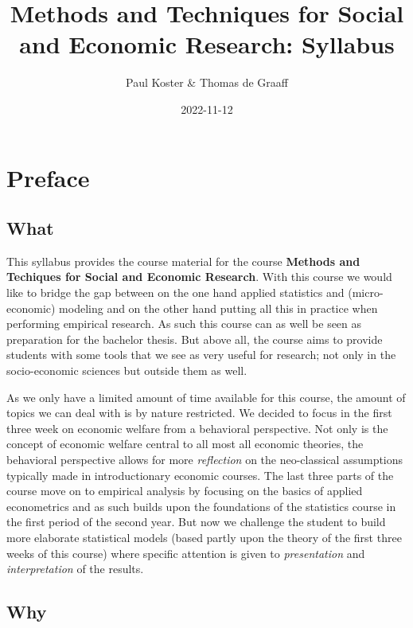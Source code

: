 \documentclass[
]{book}
\title{Methods and Techniques for Social and Economic Research: Syllabus}
\author{Paul Koster \& Thomas de Graaff}
\date{2022-11-12}
\begin{document}
\maketitle

{
\setcounter{tocdepth}{1}
\tableofcontents
}
\hypertarget{preface}{%
\chapter*{Preface}\label{preface}}

\hypertarget{what}{%
\section*{What}\label{what}}

This syllabus provides the course material for the course \textbf{Methods and Techiques for Social and Economic Research}. With this course we would like to bridge the gap between on the one hand applied statistics and (micro-economic) modeling and on the other hand putting all this in practice when performing empirical research. As such this course can as well be seen as preparation for the bachelor thesis. But above all, the course aims to provide students with some tools that we see as very useful for research; not only in the socio-economic sciences but outside them as well.

As we only have a limited amount of time available for this course, the amount of topics we can deal with is by nature restricted. We decided to focus in the first three week on economic welfare from a behavioral perspective. Not only is the concept of economic welfare central to all most all economic theories, the behavioral perspective allows for more \emph{reflection} on the neo-classical assumptions typically made in introductionary economic courses. The last three parts of the course move on to empirical analysis by focusing on the basics of applied econometrics and as such builds upon the foundations of the statistics course in the first period of the second year. But now we challenge the student to build more elaborate statistical models (based partly upon the theory of the first three weeks of this course) where specific attention is given to \emph{presentation} and \emph{interpretation} of the results.

\hypertarget{why}{%
\section*{Why}\label{why}}
\end{document}
